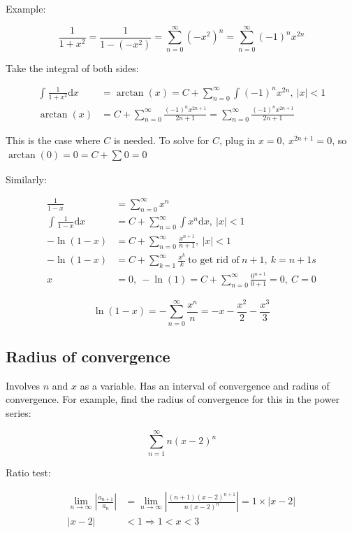 \documentclass[12pt]{article}
\theoremstyle{plain}
\theoremstyle{remark}
\theoremstyle{definition}
\begin{document}
Example:

\[\frac{1}{1 + x^{2}} = \frac{1}{1 - \left( - x^{2} \right)} = \sum_{n = 0}^{\infty}\left( - x^{2} \right)^{n} = \sum_{n = 0}^{\infty}{( - 1)^{n}x^{2n}}\]

Take the integral of both sides:

\begin{align*}
\int_{}^{}{\frac{1}{1 + x^{2}}\text{d}x} &= \arctan(x) = C + \sum_{n = 0}^{\infty}{\int_{}^{}{( - 1)^{n}x^{2n}}},\ |x| < 1 \\
\arctan(x) &= C + \sum_{n = 0}^{\infty}\frac{( - 1)^{n}x^{2n + 1}}{2n + 1} = \sum_{n = 0}^{\infty}\frac{( - 1)^{n}x^{2n + 1}}{2n + 1}
\end{align*}


This is the case where \(C\) is needed. To solve for \(C\), plug in
\(x = 0,\ x^{2n + 1} = 0\), so \(\arctan(0) = 0 = C + \sum_{}^{}0 = 0\)

Similarly:

\begin{align*}
\frac{1}{1 - x} &= \sum_{n = 0}^{\infty}x^{n} \\
\int_{}^{}{\frac{1}{1 - x}\text{d}x} &= C + \sum_{n = 0}^{\infty}{\int x^{n}\text{d}x},\ |x| < 1 \\
- \ln(1 - x) &= C + \sum_{n = 0}^{\infty}\frac{x^{n + 1}}{n + 1},\ |x| < 1 \\
- \ln(1 - x) &= C + \sum_{k = 1}^{\infty}\frac{x^{k}}{k}\ \text{to\ get\ rid\ of}\ n + 1,\ k = n + 1s \\
x &= 0,\  - \ln(1) = C + \sum_{n = 0}^{\infty}\frac{0^{n + 1}}{0 + 1} = 0,\ C = 0
\end{align*}


\[\ln(1 - x) = - \sum_{n = 0}^{\infty}\frac{x^{n}}{n} = - x - \frac{x^{2}}{2} - \frac{x^{3}}{3}\]


\subsection{Radius of convergence}

Involves \(n\) and \(x\) as a variable. Has an interval of convergence
and radius of convergence. For example, find the radius of convergence
for this in the power series:

\[\sum_{n = 1}^{\infty}{n(x - 2)^{n}}\]

Ratio test:

\begin{align*}
\lim_{n \rightarrow \infty}\left| \frac{a_{n + 1}}{a_{n}} \right| &= \lim_{n \rightarrow \infty}\left| \frac{(n + 1)(x - 2)^{n + 1}}{n(x - 2)^{n}} \right| = 1 \times |x - 2| \\
|x - 2| &< 1 \Rightarrow 1 < x < 3
\end{align*}
\end{document}
